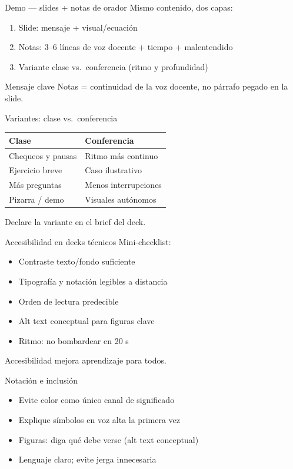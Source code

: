 \documentclass[aspectratio=169,11pt]{beamer}
\begin{document}
\begin{frame}{Demo --- slides + notas de orador}
Mismo contenido, dos capas:
\begin{enumerate}
\item Slide: mensaje + visual/ecuación
\item Notas: 3--6 líneas de voz docente + tiempo + malentendido
\item Variante clase vs.\ conferencia (ritmo y profundidad)
\end{enumerate}
\begin{alertblock}{Mensaje clave}
Notas = continuidad de la voz docente, no párrafo pegado en la slide.
\end{alertblock}
\end{frame}

\begin{frame}{Variantes: clase vs.\ conferencia}
\begin{tabularx}{\textwidth}{@{}XX@{}}
\toprule
\textbf{Clase} & \textbf{Conferencia} \\
\midrule
Chequeos y pausas & Ritmo más continuo \\
Ejercicio breve & Caso ilustrativo \\
Más preguntas & Menos interrupciones \\
Pizarra / demo & Visuales autónomos \\
\bottomrule
\end{tabularx}
\vspace{0.8em}
Declare la variante en el brief del deck.
\end{frame}

\begin{frame}{Accesibilidad en decks técnicos}
Mini-checklist:
\begin{itemize}
\item[$\square$] Contraste texto/fondo suficiente
\item[$\square$] Tipografía y notación legibles a distancia
\item[$\square$] Orden de lectura predecible
\item[$\square$] Alt text conceptual para figuras clave
\item[$\square$] Ritmo: no bombardear en 20 s
\end{itemize}
Accesibilidad mejora aprendizaje para todos.
\end{frame}

\begin{frame}{Notación e inclusión}
\begin{itemize}
\item Evite color como único canal de significado
\item Explique símbolos en voz alta la primera vez
\item Figuras: diga qué debe verse (alt text conceptual)
\item Lenguaje claro; evite jerga innecesaria
\end{itemize}
\end{frame}
\end{document}
